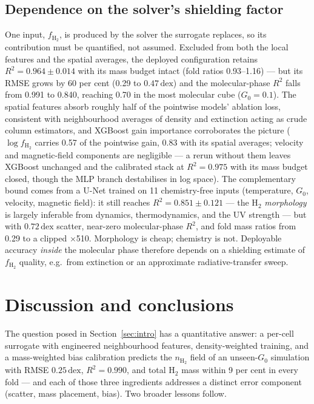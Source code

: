 \documentclass[fleqn,usenatbib]{rasti}
\newcommand{\nHH}{n_{\mathrm{H_2}}}
\newcommand{\Gzero}{G_0}
\newcommand{\fshield}{f_{\mathrm{H_2}}}
\newcommand{\dex}{\,\text{dex}}
\newcommand{\Rsq}{R^2}
\begin{document}
\subsection{Dependence on the solver's shielding factor}
\label{sec:ablation}

One input, \(\fshield\), is produced by the solver the surrogate
replaces, so its contribution must be quantified, not assumed. Excluded
from both the local features and the spatial averages, the deployed
configuration retains \(\Rsq = 0.964 \pm 0.014\) with its mass budget
intact (fold ratios 0.93--1.16) --- but its RMSE grows by 60 per cent
(0.29 to \(0.47\dex\)) and the molecular-phase \(\Rsq\) falls from 0.991
to 0.840, reaching 0.70 in the most molecular cube (\(\Gzero = 0.1\)).
The spatial features absorb roughly half of the pointwise models'
ablation loss, consistent with neighbourhood averages of density and
extinction acting as crude column estimators, and XGBoost gain
importance corroborates the picture (\(\log\fshield\) carries 0.57 of
the pointwise gain, 0.83 with its spatial averages; velocity and
magnetic-field components are negligible --- a rerun without them
leaves XGBoost unchanged and the calibrated stack at
\(\Rsq = 0.975\) with its mass budget closed, though the MLP branch
destabilises in log space). The complementary bound
comes from a U-Net trained on 11 chemistry-free inputs (temperature,
\(\Gzero\), velocity, magnetic field): it still reaches
\(\Rsq = 0.851 \pm 0.121\) --- the H\(_2\) \emph{morphology} is largely
inferable from dynamics, thermodynamics, and the UV strength --- but
with \(0.72\dex\) scatter, near-zero molecular-phase \(\Rsq\), and fold
mass ratios from 0.29 to a clipped \(\times\)510. Morphology is cheap;
chemistry is not. Deployable accuracy \emph{inside} the molecular phase
therefore depends on a shielding estimate of \(\fshield\) quality, e.g.\
from extinction or an approximate radiative-transfer sweep.

\section{Discussion and conclusions}
\label{sec:disc}

The question posed in Section~\ref{sec:intro} has a quantitative
answer: a per-cell surrogate with engineered neighbourhood features,
density-weighted training, and a mass-weighted bias calibration
predicts the \(\nHH\) field of an unseen-\(\Gzero\) simulation with
RMSE \(0.25\dex\), \(\Rsq = 0.990\), and total H\(_2\) mass within 9 per
cent in every fold --- and each of those three ingredients addresses a
distinct error component (scatter, mass placement, bias). Two broader
lessons follow.
\end{document}
